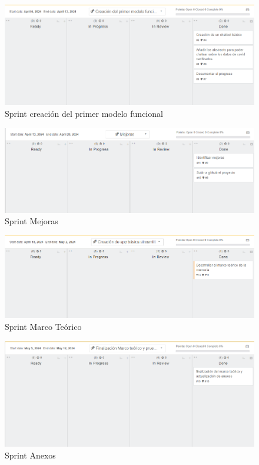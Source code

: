 \begin{figure}[h!]
    \centering
    \includegraphics[width=1\textwidth]{img/modelofuncional.png}
    \caption{Sprint creación del primer modelo funcional}
    \label{fig:modelofuncional}
\end{figure}

\begin{figure}[h!]
    \centering
    \includegraphics[width=1\textwidth]{img/Mejoras.png}
    \caption{Sprint Mejoras}
    \label{fig:mejoras}
\end{figure}

\begin{figure}[h!]
    \centering
    \includegraphics[width=1\textwidth]{img/teorico.png}
    \caption{Sprint Marco Teórico}
    \label{fig:teorico}
\end{figure}

\begin{figure}[h!]
    \centering
    \includegraphics[width=1\textwidth]{img/anexos.png}
    \caption{Sprint Anexos}
    \label{fig:anexos}
\end{figure}

